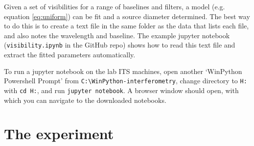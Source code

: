 \documentclass[11pt]{article}
\begin{document}
Given a set of visibilities for a range of baselines and filters, a model (e.g. equation \ref{eq:uniform}) can be fit and a source diameter determined. The best way to do this is to create a text file in the same folder as the data that lists each file, and also notes the wavelength and baseline. The example jupyter notebook (\texttt{visibility.ipynb} in the GitHub repo) shows how to read this text file and extract the fitted parameters automatically.

To run a jupyter notebook on the lab ITS machines, open another `WinPython Powershell Prompt' from \texttt{C:\textbackslash WinPython-interferometry}, change directory to \texttt{H:} with \texttt{cd H:}, and run \texttt{jupyter notebook}. A browser window should open, with which you can navigate to the downloaded notebooks.


\clearpage

\section{The experiment}\label{sec:exp}
\end{document}
